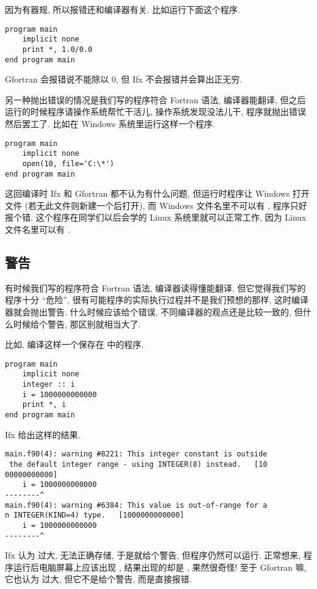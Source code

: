 因为有器规, 所以报错还和编译器有关. 比如运行下面这个程序.
\begin{lstlisting}
program main
    implicit none
    print *, 1.0/0.0
end program main
\end{lstlisting}
Gfortran 会报错说不能除以 $0$, 但 Ifx 不会报错并会算出正无穷.

另一种抛出错误的情况是我们写的程序符合 Fortran 语法, 编译器能翻译, 但之后运行的时候程序请操作系统帮忙干活儿, 操作系统发现没法儿干, 程序就抛出错误然后罢工了. 比如在 Windows 系统里运行这样一个程序.
\begin{lstlisting}
program main
    implicit none
    open(10, file='C:\*')
end program main
\end{lstlisting}
这回编译时 Ifx 和 Gfortran 都不认为有什么问题, 但运行时程序让 Windows 打开文件  (若无此文件则新建一个后打开), 而 Windows 文件名里不可以有 \ttt{*}, 程序只好报个错. 这个程序在同学们以后会学的 Linux 系统里就可以正常工作, 因为 Linux 文件名里可以有 \ttt{*}.

\subsection{警告}\label{fortran_warning}

有时候我们写的程序符合 Fortran 语法, 编译器读得懂能翻译, 但它觉得我们写的程序十分 ``危险'', 很有可能程序的实际执行过程并不是我们预想的那样, 这时编译器就会抛出警告. 什么时候应该给个错误, 不同编译器的观点还是比较一致的, 但什么时候给个警告, 那区别就相当大了.

比如, 编译这样一个保存在  中的程序.
\begin{lstlisting}
program main
    implicit none
    integer :: i
    i = 1000000000000
    print *, i
end program main
\end{lstlisting}
Ifx 给出这样的结果.
\begin{verbatim}
main.f90(4): warning #8221: This integer constant is outside
 the default integer range - using INTEGER(8) instead.   [10
00000000000]
    i = 1000000000000
--------^
main.f90(4): warning #6384: This value is out-of-range for a
n INTEGER(KIND=4) type.   [1000000000000]
    i = 1000000000000
--------^
\end{verbatim}
Ifx 认为  过大, 无法正确存储, 于是就给个警告, 但程序仍然可以运行. 正常想来, 程序运行后电脑屏幕上应该出现 , 结果出现的却是 , 果然很奇怪! 至于 Gfortran 嘛, 它也认为 过大, 但它不是给个警告, 而是直接报错.


